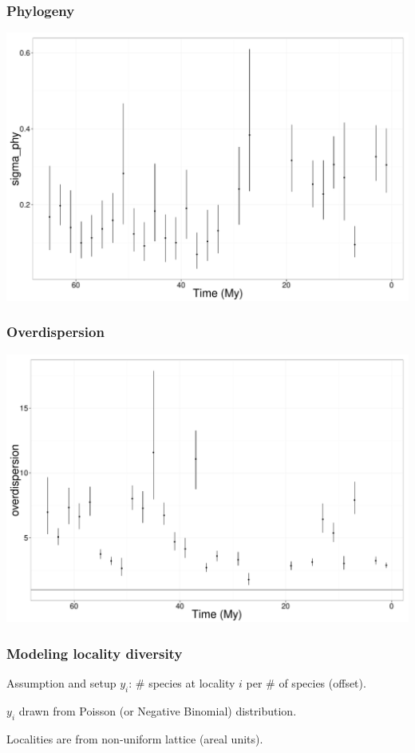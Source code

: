 \documentclass{beamer}
\begin{document}
\begin{frame}
  \frametitle{Phylogeny}
  \begin{center}
    \includegraphics[height = 0.8\textheight, width = \textwidth,  keepaspectratio = true]{figure/phy_est_time}
  \end{center}
\end{frame}

\begin{frame}
  \frametitle{Overdispersion}
  \begin{center}
    \includegraphics[height = 0.8\textheight, width = \textwidth,  keepaspectratio = true]{figure/over_est_time}
  \end{center}
\end{frame}


\begin{frame}
  \frametitle{Modeling locality diversity}
  \begin{alertblock}{Assumption and setup}
    \(y_{i}\): \# species at locality \(i\) per \# of species (offset).

    \(y_{i}\) drawn from Poisson (or Negative Binomial) distribution.

    Localities are from non-uniform lattice (areal units).
  \end{alertblock}
\end{frame}
\end{document}
